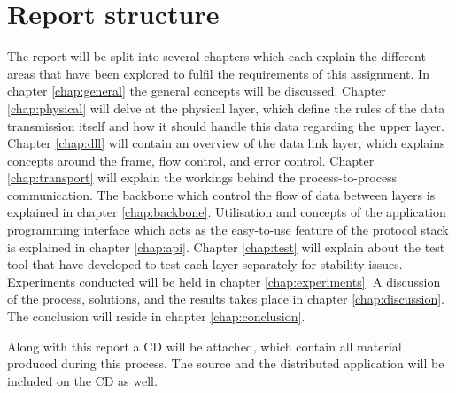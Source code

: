 \section{Report structure}
The report will be split into several chapters which each explain the different areas that have been explored to fulfil the requirements of this assignment. In chapter \ref{chap:general} the general concepts will be discussed. Chapter \ref{chap:physical} will delve at the physical layer, which define the rules of the data transmission itself and how it should handle this data regarding the upper layer. Chapter \ref{chap:dll} will contain an overview of the data link layer, which explains concepts around the frame, flow control, and error control. Chapter \ref{chap:transport} will explain the workings behind the process-to-process communication. The backbone which control the flow of data between layers is explained in chapter \ref{chap:backbone}. Utilisation and concepts of the application programming interface which acts as the easy-to-use feature of the protocol stack is explained in chapter \ref{chap:api}. Chapter \ref{chap:test} will explain about the test tool that have developed to test each layer separately for stability issues. Experiments conducted will be held in chapter \ref{chap:experiments}. A discussion of the process, solutions, and the results takes place in chapter \ref{chap:discussion}. The conclusion will reside in chapter \ref{chap:conclusion}.

Along with this report a CD will be attached, which contain all material produced during this process. The source and the distributed application will be included on the CD as well.